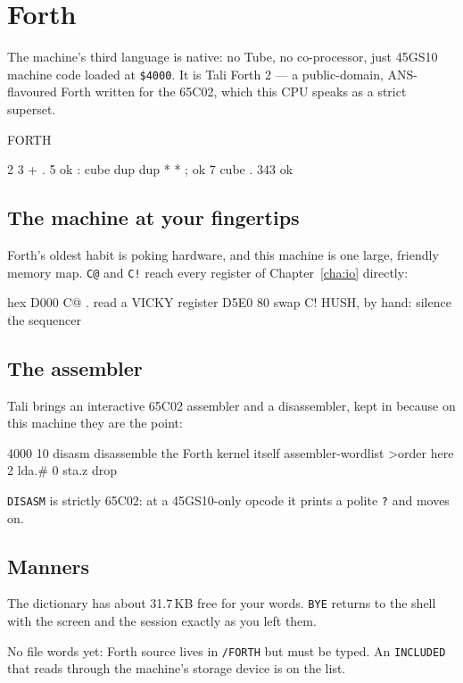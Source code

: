 \chapter{Forth}\label{cha:forth}

The machine's third language is native: no Tube, no co-processor, just
45GS10 machine code loaded at \texttt{\$4000}. It is Tali Forth 2 ---
a public-domain, ANS-flavoured Forth written for the 65C02, which this
CPU speaks as a strict superset.

\begin{type}
FORTH
\end{type}

\begin{type}
2 3 + . 5  ok
: cube dup dup * * ;  ok
7 cube . 343  ok
\end{type}


\section{The machine at your fingertips}
Forth's oldest habit is poking hardware, and this machine is one large,
friendly memory map. \verb|C@| and \verb|C!| reach every register of
Chapter~\ref{cha:io} directly:

\begin{type}
hex
D000 C@ .            read a VICKY register
D5E0 80 swap C!      HUSH, by hand: silence the sequencer
\end{type}

\section{The assembler}
Tali brings an interactive 65C02 assembler and a disassembler, kept in
because on this machine they are the point:

\begin{type}
4000 10 disasm       disassemble the Forth kernel itself
assembler-wordlist >order
here  2 lda.#  0 sta.z  drop
\end{type}

\verb|DISASM| is strictly 65C02: at a 45GS10-only opcode it prints a polite
\verb|?| and moves on.

\section{Manners}
The dictionary has about 31.7\,KB free for your words. \verb|BYE| returns
to the shell with the screen and the session exactly as you left them.

\begin{aside}
No file words yet: Forth source lives in \texttt{/FORTH} but must be typed.
An \texttt{INCLUDED} that reads through the machine's storage device is on
the list.
\end{aside}
